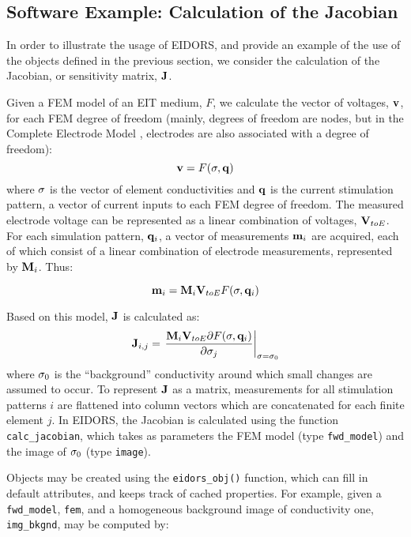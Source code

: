 \documentclass[12pt]{iopart}
\begin{document}
\subsection{Software Example: Calculation of the Jacobian}

In order to illustrate the usage of EIDORS, and provide
an example of the use of the objects defined in the previous
section, we consider
the calculation of the Jacobian, or sensitivity matrix,
$\bf J$.

Given a FEM model of an EIT medium,
$F$, we calculate the vector of voltages, $\bf v$, 
for each FEM degree of freedom
 (mainly, degrees of freedom are nodes, but in the
 Complete Electrode Model \cite{Cheng_etal_1989},
 electrodes are also associated
 with a degree of freedom):
\begin{equation}
{\bf v} = F({\bf \sigma},{\bf q})
\end{equation}
where $\bf \sigma$ is the vector of element conductivities
and $\bf q$ is the current stimulation pattern, a vector
of current inputs to each FEM degree of freedom.
The measured electrode
voltage can be represented as a linear combination of 
voltages, ${\bf V}_{toE}$.
For each simulation pattern, ${\bf q}_{i}$,
a vector of measurements ${\bf m}_i$
are acquired, each of which consist of a linear combination of
electrode measurements, represented by ${\bf M}_i$.
Thus:

\begin{equation}
{\bf m}_i = {\bf M}_{i} {\bf V}_{toE} F({\bf \sigma},{\bf q}_i)
\end{equation}

Based on this model, $\bf J$ is calculated as:
\begin{equation}
{\bf J}_{i,j} = \left.\frac{
 {\bf M}_{i} {\bf V}_{toE}{\partial}F({\bf \sigma},{\bf q}_i)
}{
{\partial}{\bf \sigma}_j
}
\right|_{
   {\bf \sigma} = {\bf \sigma}_0 
}
\end{equation}
where ${\bf \sigma}_0$ is the ``background''
conductivity around which small changes are assumed to occur.
To represent $\bf J$ as a matrix, measurements for all stimulation
patterns $i$ are flattened into column vectors which are concatenated
for each finite element $j$.
In EIDORS, the Jacobian is calculated using the function
{\tt calc\_jacobian},
which takes as parameters the FEM model (type {\tt fwd\_model})
and the image of ${\bf \sigma}_0$ (type {\tt image}).

Objects may be created using the {\tt eidors\_obj()}
function, which can fill in default attributes, and 
keeps track of cached properties.
For example, given a {\tt fwd\_model}, {\tt fem}, and
a homogeneous background image of conductivity one,
{\tt img\_bkgnd}, may be computed by:
\end{document}
